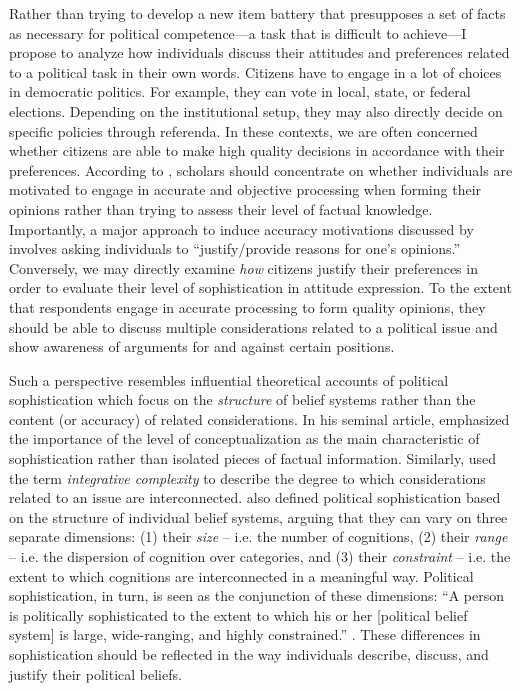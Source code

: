 \documentclass[12pt]{article}
\begin{document}
Rather than trying to develop a new item battery that presupposes a set of facts as necessary for political competence---a task that is difficult to achieve---I propose to analyze how individuals discuss their attitudes and preferences related to a political task in their own words. Citizens have to engage in a lot of choices in democratic politics. For example, they can vote in local, state, or federal elections. Depending on the institutional setup, they may also directly decide on specific policies through referenda. In these contexts, we are often concerned whether citizens are able to make high quality decisions in accordance with their preferences. According to \citet{druckman2014pathologies}, scholars should concentrate on whether individuals are motivated to engage in accurate and objective processing when forming their opinions rather than trying to assess their level of factual knowledge. Importantly, a major approach to induce accuracy motivations discussed by \citet[478]{druckman2014pathologies} involves asking individuals to ``justify/provide reasons for one's opinions.'' Conversely, we may directly examine \textit{how} citizens justify their preferences in order to evaluate their level of sophistication in attitude expression. To the extent that respondents engage in accurate processing to form quality opinions, they should be able to discuss multiple considerations related to a political issue and show awareness of arguments for and against certain positions.

Such a perspective resembles influential theoretical accounts of political sophistication which focus on the \textit{structure} of belief systems rather than the content (or accuracy) of related considerations. In his seminal article, \citet{converse1964nature} emphasized the importance of the level of conceptualization as the main characteristic of sophistication rather than isolated pieces of factual information. Similarly, \citet{tetlock1983cognitive} used the term \textsl{integrative complexity} to describe the degree to which considerations related to an issue are interconnected. \citet{luskin1987measuring} also defined political sophistication based on the structure of individual belief systems, arguing that they can vary on three separate dimensions: (1) their \textsl{size} -- i.e. the number of cognitions, (2) their \textsl{range} -- i.e. the dispersion of cognition over categories, and (3) their \textsl{constraint} -- i.e. the extent to which cognitions are interconnected in a meaningful way. Political sophistication, in turn, is seen as the conjunction of these dimensions: ``A person is politically sophisticated to the extent to which his or her [political belief system] is large, wide-ranging, and highly constrained.'' \citep[860]{luskin1987measuring}. These differences in sophistication should be reflected in the way individuals describe, discuss, and justify their political beliefs.
\end{document}

